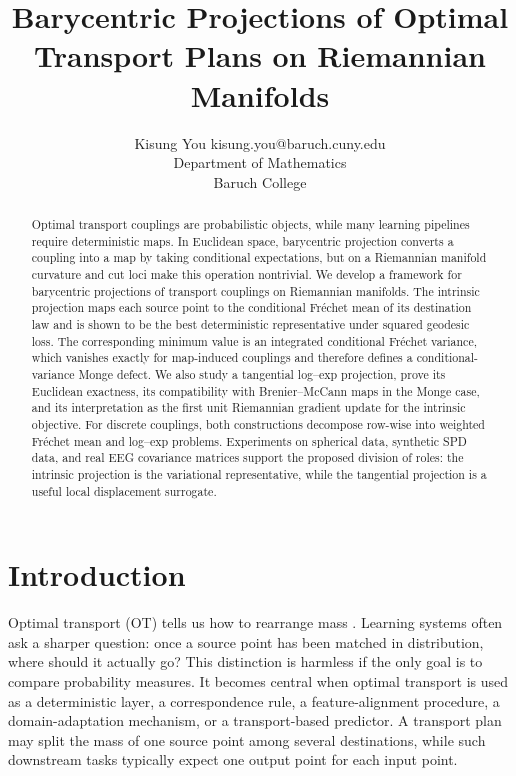 \documentclass[10pt]{article} %
\title{Barycentric Projections of Optimal Transport Plans on Riemannian Manifolds}
\author{\name Kisung You \email kisung.you@baruch.cuny.edu \\
      \addr Department of Mathematics\\
      Baruch College
      }
\theoremstyle{definition}
\providecommand{\1}{\mathbf{1}}
\begin{document}
\maketitle

\begin{abstract}
Optimal transport couplings are probabilistic objects, while many learning
pipelines require deterministic maps. In Euclidean space, barycentric projection
converts a coupling into a map by taking conditional expectations, but on a
Riemannian manifold curvature and cut loci make this operation nontrivial. We
develop a framework for barycentric projections of transport couplings on
Riemannian manifolds. The intrinsic projection maps each source point to the
conditional Fr\'echet mean of its destination law and is shown to be the best
deterministic representative under squared geodesic loss. The corresponding
minimum value is an integrated conditional Fr\'echet variance, which vanishes
exactly for map-induced couplings and therefore defines a conditional-variance
Monge defect. We also study a tangential log--exp projection, prove its
Euclidean exactness, its compatibility with Brenier--McCann maps in the Monge
case, and its interpretation as the first unit Riemannian gradient update for
the intrinsic objective. For discrete couplings, both constructions decompose
row-wise into weighted Fr\'echet mean and log--exp problems. Experiments on
spherical data, synthetic SPD data, and real EEG covariance matrices support
the proposed division of roles: the intrinsic projection is the variational
representative, while the tangential projection is a useful local displacement
surrogate.
\end{abstract}

\section{Introduction}
\label{sec:introduction}

Optimal transport (OT) tells us how to rearrange mass \citep{monge_1781_MemoireTheorieDeblais}. Learning systems often ask a sharper question: once a source point has been matched in distribution, where should it actually go? This distinction is harmless if the only goal is to compare probability measures. It becomes central when optimal transport is used as a deterministic layer, a correspondence rule, a feature-alignment procedure, a domain-adaptation mechanism, or a transport-based predictor. A transport plan may split the mass of one source point among several destinations, while such downstream tasks typically expect one output point for each input point.
\end{document}
